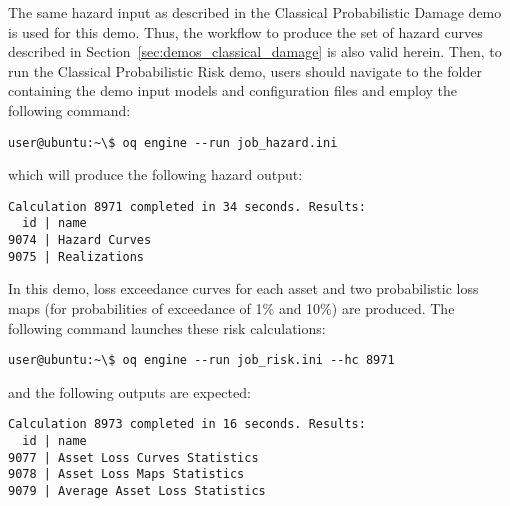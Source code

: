 The same hazard input as described in the Classical Probabilistic Damage demo
is used for this demo. Thus, the workflow to produce the set of hazard curves
described in Section~\ref{sec:demos_classical_damage} is also valid herein.
Then, to run the Classical Probabilistic Risk demo, users should navigate to
the folder containing the demo input models and configuration files and employ
the following command:

\begin{verbatim}
user@ubuntu:~\$ oq engine --run job_hazard.ini
\end{verbatim}

which will produce the following hazard output:

\begin{verbatim}
Calculation 8971 completed in 34 seconds. Results:
  id | name
9074 | Hazard Curves
9075 | Realizations
\end{verbatim}

In this demo, loss exceedance curves for each asset and two probabilistic loss
maps (for probabilities of exceedance of 1\% and 10\%) are produced. The
following command launches these risk calculations:

\begin{verbatim}
user@ubuntu:~\$ oq engine --run job_risk.ini --hc 8971
\end{verbatim}

and the following outputs are expected:

\begin{verbatim}
Calculation 8973 completed in 16 seconds. Results:
  id | name
9077 | Asset Loss Curves Statistics
9078 | Asset Loss Maps Statistics
9079 | Average Asset Loss Statistics
\end{verbatim}
